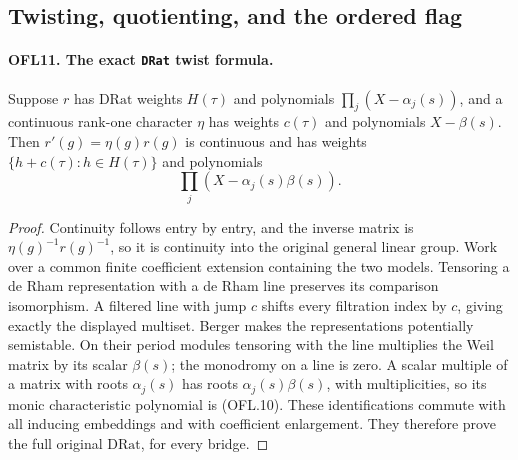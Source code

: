 \subsection{Twisting, quotienting, and the ordered flag}

\paragraph{OFL11. The exact \texttt{DRat} twist formula.}
\label{claim:OFL11}
Suppose \(r\) has \(\mathrm{DRat}\) weights \(H(\tau)\)
and polynomials \(\prod_j(X-\alpha_j(s))\), and a continuous
rank-one character \(\eta\) has weights \(c(\tau)\) and
polynomials \(X-\beta(s)\).  Then
\(r'(g)=\eta(g)r(g)\) is continuous and has weights
\(\{h+c(\tau):h\in H(\tau)\}\) and polynomials
\[
                    \prod_j(X-\alpha_j(s)\beta(s)).
 \tag{OFL.10}
\]
\begin{proof}
Continuity follows entry by entry, and the inverse matrix is
\(\eta(g)^{-1}r(g)^{-1}\), so it is continuity into the
original general linear group.  Work over a common finite
coefficient extension containing the two models.  Tensoring a de
Rham representation with a de Rham line preserves its comparison
isomorphism.  A filtered line with jump \(c\) shifts every
filtration index by \(c\), giving exactly the displayed multiset.
Berger makes the representations potentially semistable.  On
their period modules tensoring with the line multiplies the Weil
matrix by its scalar \(\beta(s)\); the monodromy on a line
is zero.  A scalar multiple of a matrix with roots
\(\alpha_j(s)\) has roots \(\alpha_j(s)\beta(s)\), with
multiplicities, so its monic characteristic polynomial is
(OFL.10).  These identifications commute with all inducing
embeddings and with coefficient enlargement.  They therefore
prove the full original \(\mathrm{DRat}\), for every bridge.
\end{proof}

